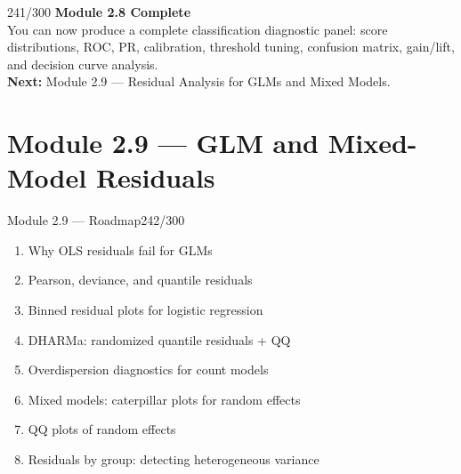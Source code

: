 \documentclass[10pt]{beamer}
\newcommand{\smark}[1]{\hfill{\scriptsize\color{codegray}#1}}
\begin{document}
\begin{frame}{}\smark{241/300}
\centering\vspace{1.5cm}
{\Large\textbf{Module 2.8 Complete}}\\[0.5cm]
You can now produce a complete classification diagnostic panel: score distributions, ROC, PR, calibration, threshold tuning, confusion matrix, gain/lift, and decision curve analysis.\\[0.5cm]
\textbf{Next:} Module 2.9 --- Residual Analysis for GLMs and Mixed Models.
\end{frame}

\section{Module 2.9 --- GLM and Mixed-Model Residuals}

\begin{frame}{Module 2.9 --- Roadmap}\smark{242/300}
\begin{enumerate}
    \item Why OLS residuals fail for GLMs
    \item Pearson, deviance, and quantile residuals
    \item Binned residual plots for logistic regression
    \item DHARMa: randomized quantile residuals + QQ
    \item Overdispersion diagnostics for count models
    \item Mixed models: caterpillar plots for random effects
    \item QQ plots of random effects
    \item Residuals by group: detecting heterogeneous variance
\end{enumerate}
\end{frame}
\end{document}
